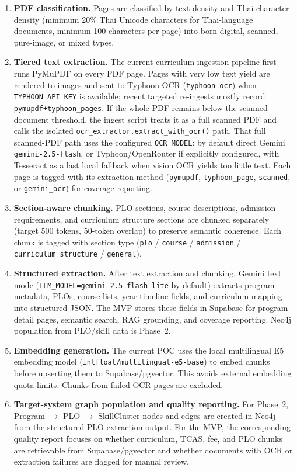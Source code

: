 \begin{enumerate}[leftmargin=80pt]
    \item \textbf{PDF classification.} Pages are classified by text density and Thai character density (minimum 20\% Thai Unicode characters for Thai-language documents, minimum 100 characters per page) into born-digital, scanned, pure-image, or mixed types.

    \item \textbf{Tiered text extraction.} The current curriculum ingestion pipeline first runs PyMuPDF on every PDF page. Pages with very low text yield are rendered to images and sent to Typhoon OCR (\texttt{typhoon-ocr}) when \texttt{TYPHOON\_API\_KEY} is available; recent targeted re-ingests mostly record \texttt{pymupdf+typhoon\_pages}. If the whole PDF remains below the scanned-document threshold, the ingest script treats it as a full scanned PDF and calls the isolated \texttt{ocr\_extractor.extract\_with\_ocr()} path. That full scanned-PDF path uses the configured \texttt{OCR\_MODEL}: by default direct Gemini \texttt{gemini-2.5-flash}, or Typhoon/OpenRouter if explicitly configured, with Tesseract as a last local fallback when vision OCR yields too little text. Each page is tagged with its extraction method (\texttt{pymupdf}, \texttt{typhoon\_page}, \texttt{scanned}, or \texttt{gemini\_ocr}) for coverage reporting.

    \item \textbf{Section-aware chunking.} PLO sections, course descriptions, admission requirements, and curriculum structure sections are chunked separately (target 500 tokens, 50-token overlap) to preserve semantic coherence. Each chunk is tagged with section type (\texttt{plo} / \texttt{course} / \texttt{admission} / \texttt{curriculum\_structure} / \texttt{general}).

    \item \textbf{Structured extraction.} After text extraction and chunking, Gemini text mode (\texttt{LLM\_MODEL=gemini-2.5-flash-lite} by default) extracts program metadata, PLOs, course lists, year timeline fields, and curriculum mapping into structured JSON. The MVP stores these fields in Supabase for program detail pages, semantic search, RAG grounding, and coverage reporting. Neo4j population from PLO/skill data is Phase~2.

    \item \textbf{Embedding generation.} The current POC uses the local multilingual E5 embedding model (\texttt{intfloat/multilingual-e5-base}) to embed chunks before upserting them to Supabase/pgvector. This avoids external embedding quota limits. Chunks from failed OCR pages are excluded.

    \item \textbf{Target-system graph population and quality reporting.} For Phase~2, Program $\rightarrow$ PLO $\rightarrow$ SkillCluster nodes and edges are created in Neo4j from the structured PLO extraction output. For the MVP, the corresponding quality report focuses on whether curriculum, TCAS, fee, and PLO chunks are retrievable from Supabase/pgvector and whether documents with OCR or extraction failures are flagged for manual review.
\end{enumerate}

